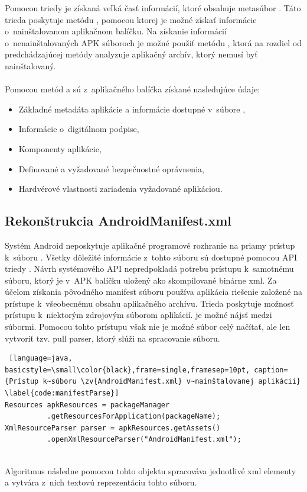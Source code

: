 Pomocou triedy  je získaná veľká časť informácií, ktoré obsahuje metasúbor . Táto trieda poskytuje metódu , pomocou ktorej je možné získať informácie o~nainštalovanom aplikačnom balíčku. Na získanie informácií o~nenainštalovaných APK súboroch je možné použiť metódu , ktorá na rozdiel od predchádzajúcej metódy analyzuje aplikačný archív, ktorý nemusí byť nainštalovaný.
\\\\
\noindent Pomocou metód  a  sú z~aplikačného balíčka získané nasledujúce údaje:
\begin{itemize}
	\item Základné metadáta aplikácie a informácie dostupné v~súbore ,
	\item Informácie o~digitálnom podpise,
	\item Komponenty aplikácie,
	\item Definované a vyžadované bezpečnostné oprávnenia,
	\item Hardvérové vlastnosti zariadenia vyžadované aplikáciou.
\end{itemize}

\subsection{Rekonštrukcia AndroidManifest.xml}
Systém Android neposkytuje aplikačné programové rozhranie na priamy prístup k~súboru . Všetky dôležité informácie z~tohto súboru sú dostupné pomocou API triedy . Návrh systémového API nepredpokladá potrebu prístupu k~samotnému  súboru, ktorý je v~APK balíčku uložený ako skompilované binárne xml.  Za účelom získania pôvodného manifest súboru používa aplikácia  riešenie založené na prístupe k~všeobecnému obsahu aplikačného archívu. Trieda  poskytuje možnosť prístupu k~niektorým zdrojovým súborom aplikácií.  je možné nájsť medzi 
 súbormi. Pomocou tohto prístupu však nie je možné súbor celý načítať, ale len vytvoriť tzv. pull parser, ktorý slúži na spracovanie  súboru. 
\begin{lstlisting} [language=java, basicstyle=\small\color{black},frame=single,framesep=10pt, caption= {Prístup k~súboru \zv{AndroidManifest.xml} v~nainštalovanej aplikácii} \label{code:manifestParse}]
Resources apkResources = packageManager
          .getResourcesForApplication(packageName);
XmlResourceParser parser = apkResources.getAssets()
          .openXmlResourceParser("AndroidManifest.xml");
\end{lstlisting}
\mbox{}\\
\noindent Algoritmus následne pomocou tohto objektu spracováva jednotlivé xml elementy a vytvára z~nich textovú reprezentáciu tohto súboru.

